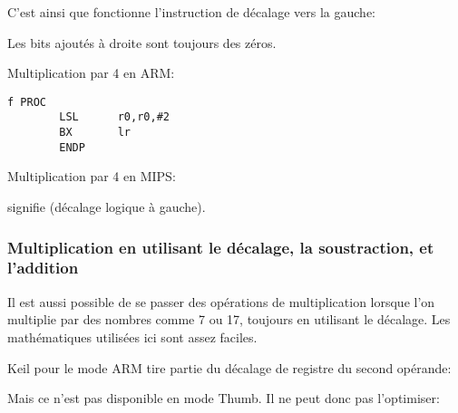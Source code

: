 C'est ainsi que fonctionne l'instruction de décalage vers la gauche:



Les bits ajoutés à droite sont toujours des zéros.

Multiplication par 4 en ARM:

\begin{lstlisting}[caption=\NonOptimizingKeilVI (\ARMMode),style=customasmARM]
f PROC
        LSL      r0,r0,#2
        BX       lr
        ENDP
\end{lstlisting}

Multiplication par 4 en MIPS:



 signifie  (décalage logique à gauche).

\subsubsection{Multiplication en utilisant le décalage, la soustraction, et l'addition}
\label{multiplication_using_shifts_adds_subs}

Il est aussi possible de se passer des opérations de multiplication lorsque l'on
multiplie par des nombres comme 7 ou 17, toujours en utilisant le décalage.
Les mathématiques utilisées ici sont assez faciles.








Keil pour le mode ARM tire partie du décalage de registre du second opérande:



Mais ce n'est pas disponible en mode Thumb.
Il ne peut donc pas l'optimiser:



